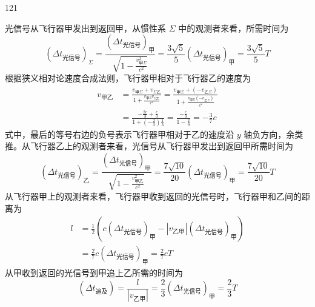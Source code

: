 \begin{solution}{121}
    \begin{subsolution}
        光信号从飞行器甲发出到返回甲，从惯性系 $\Sigma$ 中的观测者来看，所需时间为
        \begin{equation}
            (\Delta t_{\text{光信号}})_{\Sigma} = \frac{(\Delta t_{\text{光信号}})_{\mathrm{甲}}}{\sqrt{1 - \frac{v_{\mathrm{甲}\Sigma}^{2}}{c^{2}}}} = \frac{3 \sqrt{5}}{5} (\Delta t_{\text{光信号}})_{\mathrm{甲}} = \frac{3 \sqrt{5}}{5} T
            \label{eq:1.s121}
        \end{equation}
        根据狭义相对论速度合成法则，飞行器甲相对于飞行器乙的速度为
        \begin{align}
            v_{\text{甲乙}} & = \frac{v_{\text{甲}\Sigma} + v_{\Sigma \text{乙}}}{1 + \frac{v_{\text{甲}\Sigma} v_{\Sigma \text{乙}}}{c^{2}}} = \frac{v_{\text{甲}\Sigma} + (-v_{\text{乙}\Sigma})}{1 + \frac{v_{\text{甲}\Sigma} (-v_{\text{乙}\Sigma})}{c^{2}}} \nonumber \\
            & = \frac{-\frac{2c}{3} + \frac{c}{3}}{1 + (-\frac{2}{3}) \frac{1}{3}} = \frac{-\frac{c}{3}}{1 - \frac{2}{9}} = -\frac{3}{7} c
            \label{eq:2.s121}
        \end{align}
        式中，最后的等号右边的负号表示飞行器甲相对于乙的速度沿 $y$ 轴负方向，余类推。从飞行器乙上的观测者来看，光信号从飞行器甲发出到返回甲所需时间为
        \begin{equation}
            (\Delta t_{\text{光信号}})_{\text{乙}} = \frac{(\Delta t_{\text{光信号}})_{\text{甲}}}{\sqrt{1 - \frac{v_{\text{甲乙}}^{2}}{c^{2}}}} = \frac{7 \sqrt{10}}{20} (\Delta t_{\text{光信号}})_{\text{甲}} = \frac{7 \sqrt{10}}{20} T
            \label{eq:3.s121}
        \end{equation}
        从飞行器甲上的观测者来看，飞行器甲收到返回的光信号时，飞行器甲和乙间的距离为
        \begin{align}
            l & = \frac{1}{2} \left(c (\Delta t_{\text{光信号}})_{\text{甲}} - |v_{\text{乙甲}}| (\Delta t_{\text{光信号}})_{\text{甲}}\right) \nonumber \\
            & = \frac{2}{7} c (\Delta t_{\text{光信号}})_{\text{甲}} = \frac{2}{7} c T
            \label{eq:4.s121}
        \end{align}
        从甲收到返回的光信号到甲追上乙所需的时间为
        \begin{equation}
            (\Delta t_{\text{追及}}) = \frac{l}{|v_{\text{乙甲}}|} = \frac{2}{3} (\Delta t_{\text{光信号}})_{\text{甲}} = \frac{2}{3} T
            \label{eq:5.s121}

\end{equation}
\end{subsolution}
\end{solution}
